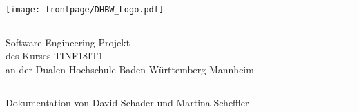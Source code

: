 \begin{titlepage}
	
	\hfill
	\begin{minipage}{.45\textwidth}
		\begin{flushright}
			\texttt{[image: frontpage/DHBW\_Logo.pdf]}
		\end{flushright}
	\end{minipage}
	
	\rule{\textwidth}{.5pt}
	
	\vspace{0.5cm}
	
	\centering
	
	\vfill
	\LARGE{Software Engineering-Projekt}\\
	\vspace{0.5cm}
	\LARGE{des Kurses TINF18IT1}\\
	\vspace{0.5cm}
	\LARGE{an der Dualen Hochschule Baden-Württemberg Mannheim}\\
	\vfill
	\small
	\centering
	\rule{\textwidth}{.5pt}
	Dokumentation von David Schader und Martina Scheffler
	
\end{titlepage}